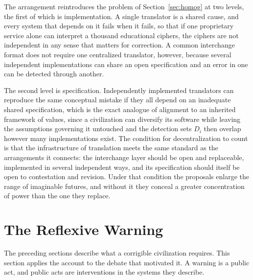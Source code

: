 \documentclass[11pt]{article}
\begin{document}
The arrangement reintroduces the problem of Section~\ref{sec:homog} at two levels, the first of which is implementation. A single translator is a shared cause, and every system that depends on it fails when it fails, so that if one proprietary service alone can interpret a thousand educational ciphers, the ciphers are not independent in any sense that matters for correction. A common interchange format does not require one centralized translator, however, because several independent implementations can share an open specification and an error in one can be detected through another.

The second level is specification. Independently implemented translators can reproduce the same conceptual mistake if they all depend on an inadequate shared specification, which is the exact analogue of alignment to an inherited framework of values, since a civilization can diversify its software while leaving the assumptions governing it untouched and the detection sets $D_i$ then overlap however many implementations exist. The condition for decentralization to count is that the infrastructure of translation meets the same standard as the arrangements it connects: the interchange layer should be open and replaceable, implemented in several independent ways, and its specification should itself be open to contestation and revision. Under that condition the proposals enlarge the range of imaginable futures, and without it they conceal a greater concentration of power than the one they replace.

\section{The Reflexive Warning}\label{sec:warn}

The preceding sections describe what a corrigible civilization requires. This section applies the account to the debate that motivated it. A warning is a public act, and public acts are interventions in the systems they describe.
\end{document}
